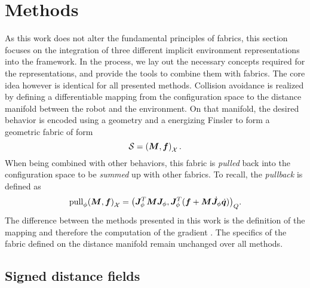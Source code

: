 \section{Methods}
\label{sec:ral24_methods}

As this work does not alter the fundamental principles of
\ac{fabrics}, this section focuses on the integration of
three different implicit environment representations into
the framework. In the process, we lay out the necessary
concepts required for the representations, and provide the
tools to combine them with \ac{fabrics}. The core idea
however is identical for all presented methods.
Collision avoidance is realized by defining a differentiable
mapping \map{} from the configuration space \Q{} to the distance
manifold between the robot and the environment. On that
manifold, the desired behavior is encoded using a geometry
and a energizing Finsler to form a geometric fabric of form
\[
  \mathcal{S} = \left(\bm{M}, \bm{f}\right)_{\mathcal{X}}.
\]
When being combined with other behaviors, this fabric is
\textit{pulled} back into the configuration space \Q{} to
be \textit{summed} up with other fabrics. To recall, the
\textit{pullback} is defined as
\[
  \textrm{pull}_{\phi}{\left(\bm{M},\bm{f}\right)_{\mathcal{X}}} = {\left(\bm{J}^T_{\phi}\bm{M}\bm{J}_{\phi}, \bm{J}^T_{\phi}(\bm{f}+\bm{M}\dot{\bm{J}}_{\phi}\dot{\bm{q}})\right)}_{Q}.
\]
The difference between the methods presented in
this work is the definition of the mapping \map{} and
therefore the computation of the gradient \J{}. The
specifics of the fabric defined on the distance manifold 
remain unchanged over all methods.
%
\subsection{Signed distance fields}
\label{sub:signed_distance_fields}

